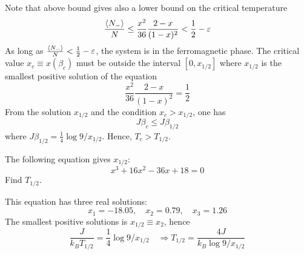 \documentclass[../main/main.tex]{subfiles}
\begin{document}
\begin{remark}
Note that above bound gives also a lower bound on the critical temperature
\begin{equation*}
    \frac{\expval{N_-} }{N} \le \frac{x^2}{36} \frac{2-x}{(1-x)^2} < \frac{1}{2} - \varepsilon
\end{equation*}
As long as \(   \frac{\expval{N_-} }{N}  < \frac{1}{2} - \varepsilon  \), the system is in the ferromagnetic phase. The critical value \( x_c \equiv x (\beta _c) \) must be outside the interval \( [0,x_{1/2}] \) where \( x_{1/2} \)   is the smallest positive solution of the equation
\begin{equation*}
  \frac{x^2}{36} \frac{2-x}{(1-x)^2} = \frac{1}{2}
\end{equation*}
From the solution \( x_{1/2} \) and the condition \( x_c > x_{1/2} \), one has
\begin{equation*}
  J \beta _c \le J \beta_{1/2}
\end{equation*}
where \( J \beta _{1/2} = \frac{1}{4} \log{9/x_{1/2}}  \). 
Hence, \( T_c > T_{1/2} \).
\end{remark}

\begin{exercise}{}{}
The following equation gives \( x_{1/2} \):
\begin{equation*}
  x^3 + 16x^2 - 36 x + 18 = 0
\end{equation*}
 Find \( T_{1/2} \).
\begin{solution}
This equation has three real solutions:
\begin{equation*}
    x_1 =-18.05, \quad x_2=0.79, \quad x_3=1.26
\end{equation*}
The smallest positive solutions is \( x_{1/2} \equiv x_2 \), hence 
\begin{equation*}
\frac{J}{k_B T_{1/2} } = \frac{1}{4} \log{9/x_{1/2}} \quad \Rightarrow 
T_{1/2} = \frac{4J}{k_B \log{9/x_{1/2}}}
\end{equation*}
\end{solution}
\end{exercise}


\clearpage
\end{document}
